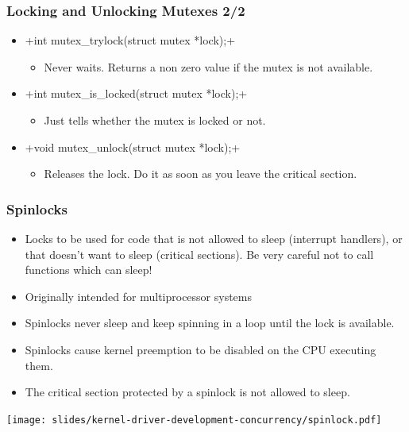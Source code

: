 \begin{frame}[fragile]
  \frametitle{Locking and Unlocking Mutexes 2/2}
  \begin{itemize}
  \item {}+int mutex_trylock(struct mutex *lock);+
    \begin{itemize}
    \item Never waits. Returns a non zero value if the mutex is not
      available.
    \end{itemize}
  \item {}+int mutex_is_locked(struct mutex *lock);+
    \begin{itemize}
    \item Just tells whether the mutex is locked or not.
    \end{itemize}
  \item {}+void mutex_unlock(struct mutex *lock);+
    \begin{itemize}
    \item Releases the lock. Do it as soon as you leave the critical
      section.
    \end{itemize}
  \end{itemize}
\end{frame}

\begin{frame}
  \frametitle{Spinlocks}
  \begin{itemize}
  \item Locks to be used for code that is not allowed to sleep
    (interrupt handlers), or that doesn't want to sleep (critical
    sections). Be very careful not to call functions which can sleep!
  \item Originally intended for multiprocessor systems
  \item Spinlocks never sleep and keep spinning in a loop until the
    lock is available.
  \item Spinlocks cause kernel preemption to be disabled on the CPU
    executing them.
  \item The critical section protected by a spinlock is not allowed to
    sleep.
  \end{itemize}
  \begin{center}
    \texttt{[image: slides/kernel-driver-development-concurrency/spinlock.pdf]}
  \end{center}
\end{frame}

